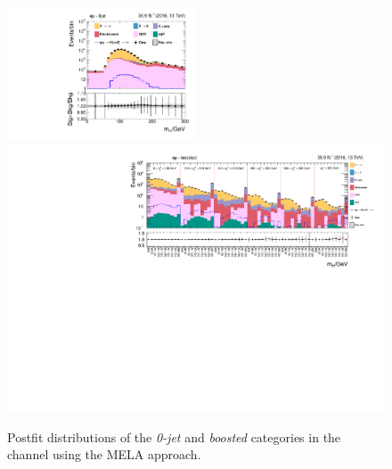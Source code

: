 \begin{figure}[h!]
    \centering
        \includegraphics[width=0.5\textwidth]{Figures/statana/Postfit_JEC_mela3D/postfit_fit_s_htt_em_1_13TeV.pdf}\\
        \includegraphics[width=\textwidth]{Figures/statana/Postfit_JEC_mela3D/postfit_fit_s_htt_em_2_13TeV.pdf}
    \caption{Postfit distributions of the \textit{0-jet} and \textit{boosted} categories in the \emu{} channel  using the MELA approach.}
\end{figure}
